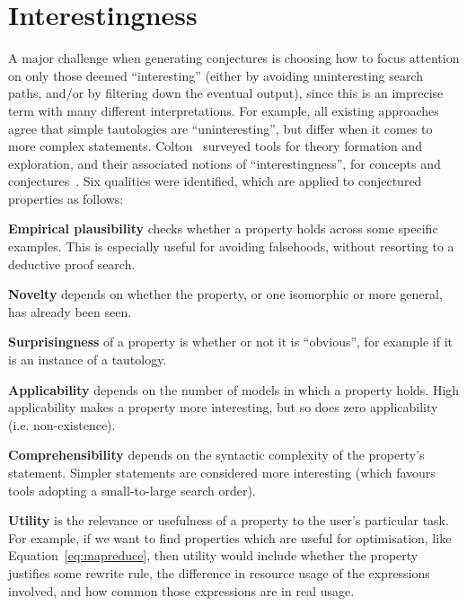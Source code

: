 \section{Interestingness}
\label{sec:interestingness}

A major challenge when generating conjectures is choosing how to focus attention
on only those deemed ``interesting'' (either by avoiding uninteresting search
paths, and/or by filtering down the eventual output), since this is an imprecise
term with many different interpretations. For example, all existing approaches
agree that simple tautologies are ``uninteresting'', but differ when it comes to
more complex statements.  Colton~\etal{} surveyed tools for theory formation
and exploration, and their associated notions of ``interestingness'', for
concepts and conjectures~\cite{colton2000notion}. Six qualities were identified,
which are applied to conjectured properties as follows:

{\bf Empirical plausibility} checks whether a property holds across some
specific examples. This is especially useful for avoiding falsehoods, without
resorting to a deductive proof search.

{\bf Novelty} depends on whether the property, or one isomorphic or more
general, has already been seen.

{\bf Surprisingness} of a property is whether or not it is ``obvious'', for
example if it is an instance of a tautology.

{\bf Applicability} depends on the number of models in which a
property holds. High applicability makes a property more interesting, but so
does zero applicability (i.e. non-existence).

{\bf Comprehensibility} depends on the syntactic complexity of the property's
statement. Simpler statements are considered more interesting (which favours
tools adopting a small-to-large search order).

{\bf Utility} is the relevance or usefulness of a property to the user's
particular task. For example, if we want to find properties which are useful for
optimisation, like Equation~\ref{eq:mapreduce}, then utility would include
whether the property justifies some rewrite rule, the difference in resource
usage of the expressions involved, and how common those expressions are in real
usage.

